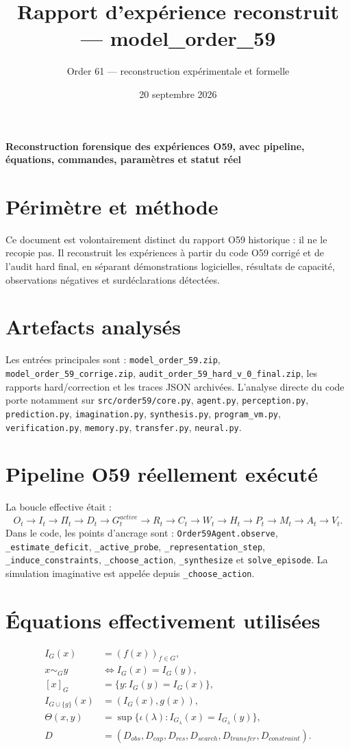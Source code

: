 \documentclass[11pt,a4paper]{article}
\title{Rapport d’expérience reconstruit — model\_order\_59}
\author{Order 61 — reconstruction expérimentale et formelle}
\date{20 septembre 2026}
\begin{document}
\maketitle
\begin{center}\textbf{Reconstruction forensique des expériences O59, avec pipeline, équations, commandes, paramètres et statut réel}\end{center}
\tableofcontents
\newpage
\section{Périmètre et méthode}
Ce document est volontairement distinct du rapport O59 historique : il ne le recopie pas. Il reconstruit les expériences à partir du code O59 corrigé et de l'audit hard final, en séparant démonstrations logicielles, résultats de capacité, observations négatives et surdéclarations détectées.\section{Artefacts analysés}
Les entrées principales sont : \texttt{model\_order\_59.zip}, \texttt{model\_order\_59\_corrige.zip}, \texttt{audit\_order\_59\_hard\_v\_0\_final.zip}, les rapports hard/correction et les traces JSON archivées. L'analyse directe du code porte notamment sur \texttt{src/order59/core.py}, \texttt{agent.py}, \texttt{perception.py}, \texttt{prediction.py}, \texttt{imagination.py}, \texttt{synthesis.py}, \texttt{program\_vm.py}, \texttt{verification.py}, \texttt{memory.py}, \texttt{transfer.py}, \texttt{neural.py}.\section{Pipeline O59 réellement exécuté}
La boucle effective était :
\[
O_t\to I_t\to \Pi_t\to D_t\to G_t^{active}\to R_t\to C_t\to W_t\to H_t\to P_t\to M_t\to A_t\to V_t.
\]
Dans le code, les points d'ancrage sont : \texttt{Order59Agent.observe}, \texttt{\_estimate\_deficit}, \texttt{\_active\_probe}, \texttt{\_representation\_step}, \texttt{\_induce\_constraints}, \texttt{\_choose\_action}, \texttt{\_synthesize} et \texttt{solve\_episode}. La simulation imaginative est appelée depuis \texttt{\_choose\_action}.\section{Équations effectivement utilisées}
\begin{align*}
I_G(x)&=(f(x))_{f\in G},\\
x\sim_Gy&\iff I_G(x)=I_G(y),\\
[x]_G&=\{y:I_G(y)=I_G(x)\},\\
I_{G\cup\{g\}}(x)&=(I_G(x),g(x)),\\
\Theta(x,y)&=\sup\{\iota(\lambda):I_{G_\lambda}(x)=I_{G_\lambda}(y)\},\\
D&=(D_{obs},D_{cap},D_{res},D_{search},D_{transfer},D_{constraint}).
\end{align*}
\end{document}
